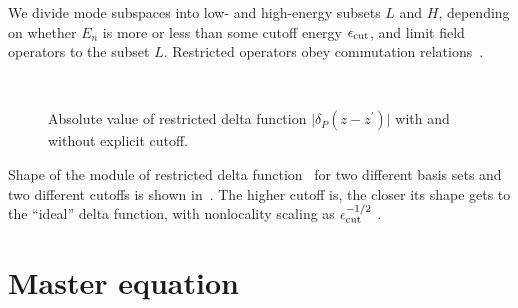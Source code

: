 We divide mode subspaces into low- and high-energy subsets $L$ and $H$,
depending on whether $E_n$ is more or less than some cutoff energy $\epsilon_{\mathrm{cut}}$,
and limit field operators to the subset $L$.
Restricted operators obey commutation relations~.

\begin{figure}
\begin{center}
 \\
\end{center}
\caption{Absolute value of restricted delta function $\lvert \delta_P(z - z^\prime) \rvert$ with and without explicit cutoff.}
\label{fig:wigner:restricted-delta}
\end{figure}

Shape of the module of restricted delta function~ for two different basis sets and two different cutoffs is shown in~.
The higher cutoff is, the closer its shape gets to the ``ideal'' delta function,
with nonlocality scaling as $\epsilon_{\mathrm{cut}}^{-1/2}$ .


\section{Master equation}

